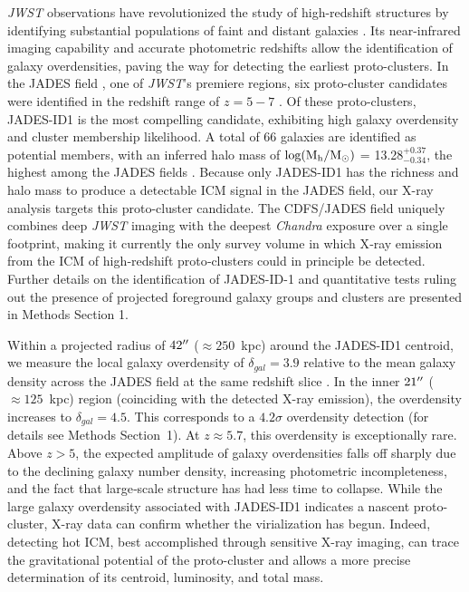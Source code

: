 \documentclass[pdflatex,sn-mathphys-num]{sn-jnl}
\newcommand{\arcsec}{\mbox{\ensuremath{^{\prime\prime}}}}
\theoremstyle{thmstyleone}
\theoremstyle{thmstyletwo}
\theoremstyle{thmstylethree}
\begin{document}
\textit{JWST} observations have revolutionized the study of high-redshift structures by identifying substantial populations of faint and distant galaxies \cite{2023Natur.616..266L,2023NatAs...7..731B,2022ApJ...938L..15C}. Its near-infrared imaging capability and accurate photometric redshifts allow the identification of galaxy overdensities, paving the way for detecting the earliest proto-clusters. In the JADES field \cite{2023arXiv230602465E}, one of \textit{JWST}'s premiere regions, six proto-cluster candidates were identified in the redshift range of $z=5-7$ \cite{2025MNRAS.539.1796L}. Of these proto-clusters, JADES-ID1 is the most compelling candidate, exhibiting high galaxy overdensity and cluster membership likelihood. A total of 66 galaxies are identified as potential members, with an inferred halo mass of $\rm log(M_h/M_{\odot})$ = 13.28$^{+0.37}_{-0.34}$, the highest among the JADES fields \cite{2025MNRAS.539.1796L}. Because only JADES-ID1 has the richness and halo mass to produce a detectable ICM signal in the JADES field, our X-ray analysis targets this proto-cluster candidate. The CDFS/JADES field uniquely combines deep \textit{JWST} imaging with the deepest \textit{Chandra} exposure over a single footprint, making it currently the only survey volume in which X‑ray emission from the ICM of high‑redshift proto‑clusters could in principle be detected. Further details on the identification of JADES-ID-1 and quantitative tests ruling out the presence of projected foreground galaxy groups and clusters are presented in Methods Section 1.

Within a projected radius of $42\arcsec$ ($\approx250$~kpc) around the JADES-ID1 centroid, we measure the local galaxy overdensity of $\delta_{gal} = 3.9$ relative to the mean galaxy density across the JADES field at the same redshift slice \cite{2025MNRAS.539.1796L}. In the inner $21\arcsec$ ($\approx125$~kpc) region (coinciding with the detected X-ray emission), the overdensity increases to $\delta_{gal} = 4.5$. This corresponds to a $4.2\sigma$ overdensity detection (for details see Methods Section~1). At $z\approx5.7$, this overdensity is exceptionally rare.  Above $z>5$, the expected amplitude of galaxy overdensities falls off sharply due to the declining galaxy number density, increasing photometric incompleteness, and the fact that large‐scale structure has had less time to collapse. While the large galaxy overdensity associated with JADES-ID1 indicates a nascent proto-cluster, X-ray data can confirm whether the virialization has begun. Indeed, detecting hot ICM, best accomplished through sensitive X-ray imaging, can trace the gravitational potential of the proto-cluster and allows a more precise determination of its centroid, luminosity, and total mass.
\end{document}
